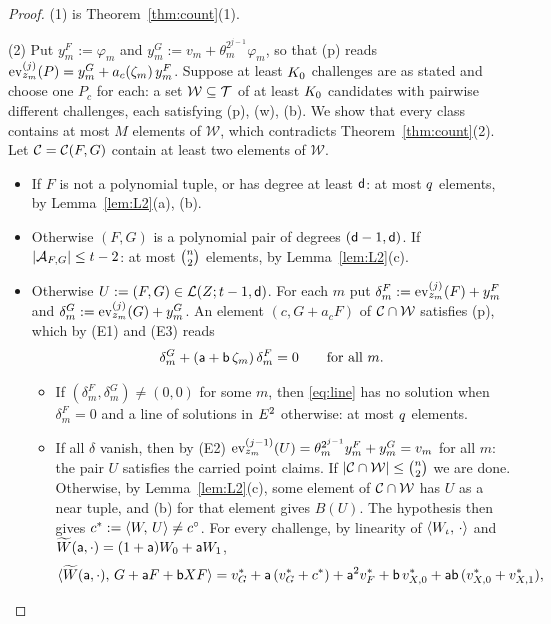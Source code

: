 \begin{proof}
(1) is Theorem~\ref{thm:count}(1).

(2) Put $y^F_m:=\varphi_m$ and $y^G_m:=v_m+\theta_m^{2^{j-1}}\varphi_m$, so that (p) reads $\operatorname{ev}^{(j)}_{z_m}(P)=y^G_m+a_c(\zeta_m)\,y^F_m$. Suppose at least $K_0$ challenges are as stated and choose one $P_c$ for each: a set $\mathcal W\subseteq\mathcal{T}$ of at least $K_0$ candidates with pairwise different challenges, each satisfying (p), (w), (b). We show that every class contains at most $M$ elements of $\mathcal W$, which contradicts Theorem~\ref{thm:count}(2). Let $\mathcal{C}=\mathcal{C}(F,G)$ contain at least two elements of $\mathcal W$.
\begin{itemize}[itemsep=1pt,topsep=2pt]
\item If $F$ is not a polynomial tuple, or has degree at least $\mathsf{d}$: at most $q$ elements, by Lemma~\ref{lem:L2}(a), (b).
\item Otherwise $(F,G)$ is a polynomial pair of degrees $(\mathsf{d}-1,\mathsf{d})$. If $|\mathcal{A}_{F,G}|\le t-2$: at most $\binom{n}2$ elements, by Lemma~\ref{lem:L2}(c).
\item Otherwise $U:=(F,G)\in\mathcal{L}(Z;t-1,\mathsf{d})$. For each $m$ put $\delta^F_m:=\operatorname{ev}^{(j)}_{z_m}(F)+y^F_m$ and $\delta^G_m:=\operatorname{ev}^{(j)}_{z_m}(G)+y^G_m$. An element $(c,G+a_cF)$ of $\mathcal{C}\cap\mathcal W$ satisfies (p), which by (E1) and (E3) reads
\begin{equation}\label{eq:line}
\delta^G_m+(\mathsf{a}+\mathsf{b}\,\zeta_m)\,\delta^F_m=0\qquad\text{for all }m.
\end{equation}
\begin{itemize}[itemsep=1pt,topsep=1pt]
\item If $(\delta^F_m,\delta^G_m)\ne(0,0)$ for some $m$, then \eqref{eq:line} has no solution when $\delta^F_m=0$ and a line of solutions in $E^2$ otherwise: at most $q$ elements.
\item If all $\delta$ vanish, then by (E2) $\operatorname{ev}^{(j-1)}_{z_m}(U)=\theta_m^{2^{j-1}}y^F_m+y^G_m=v_m$ for all $m$: the pair $U$ satisfies the carried point claims. If $|\mathcal{C}\cap\mathcal W|\le\binom{n}2$ we are done. Otherwise, by Lemma~\ref{lem:L2}(c), some element of $\mathcal{C}\cap\mathcal W$ has $U$ as a near tuple, and (b) for that element gives $B(U)$. The hypothesis then gives $c^\ast:=\langle W,\, U \rangle\ne c^\circ$. For every challenge, by linearity of $\langle W_\iota,\, \cdot \rangle$ and $\widetilde{W}(\mathsf{a},\cdot)=(1+\mathsf{a})W_0+\mathsf{a} W_1$,
\[
\langle \widetilde{W}(\mathsf{a},\cdot),\, G+\mathsf{a} F+\mathsf{b} XF \rangle=v^\ast_G+\mathsf{a}\,(v^\ast_G+c^\ast)+\mathsf{a}^2v^\ast_F+\mathsf{b}\,v^\ast_{X,0}+\mathsf{a}\mathsf{b}\,(v^\ast_{X,0}+v^\ast_{X,1}),
\]
\end{itemize}
\end{itemize}
\end{proof}
